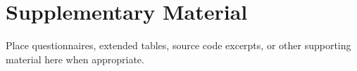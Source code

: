 \chapter{Supplementary Material}

Place questionnaires, extended tables, source code excerpts, or other supporting
material here when appropriate.
